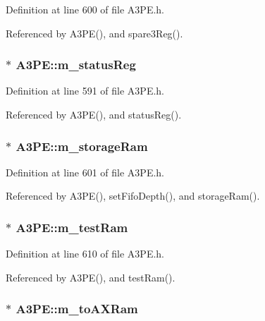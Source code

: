 Definition at line 600 of file A3PE.h.

Referenced by A3PE(), and spare3Reg().\hypertarget{classA3PE_a2281e3d12a2dffad99ec55be2b695f53}{
\subsubsection[{m\_\-statusReg}]{$\ast$ {\bf A3PE::m\_\-statusReg}}}
\label{classA3PE_a2281e3d12a2dffad99ec55be2b695f53}


Definition at line 591 of file A3PE.h.

Referenced by A3PE(), and statusReg().\hypertarget{classA3PE_a41e317474e0c6e63bad4648903279be9}{
\subsubsection[{m\_\-storageRam}]{$\ast$ {\bf A3PE::m\_\-storageRam}}}
\label{classA3PE_a41e317474e0c6e63bad4648903279be9}


Definition at line 601 of file A3PE.h.

Referenced by A3PE(), setFifoDepth(), and storageRam().\hypertarget{classA3PE_ad788e41ef5c674ab1a7671f3db0ffef6}{
\subsubsection[{m\_\-testRam}]{$\ast$ {\bf A3PE::m\_\-testRam}}}
\label{classA3PE_ad788e41ef5c674ab1a7671f3db0ffef6}


Definition at line 610 of file A3PE.h.

Referenced by A3PE(), and testRam().\hypertarget{classA3PE_ae586a3d2fd21556e84e1af656e3430b5}{
\subsubsection[{m\_\-toAXRam}]{$\ast$ {\bf A3PE::m\_\-toAXRam}}}
\label{classA3PE_ae586a3d2fd21556e84e1af656e3430b5}


